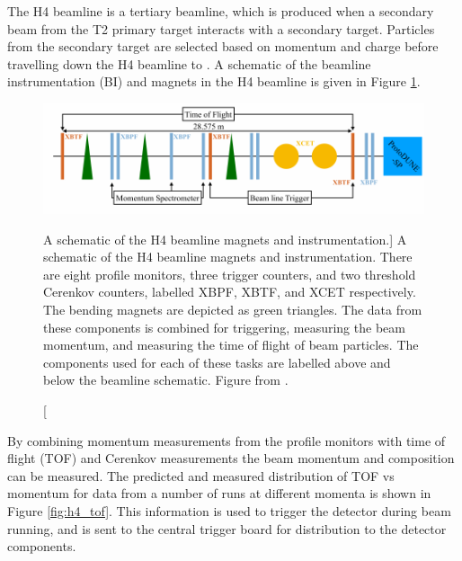 The H4 beamline is a tertiary beamline, which is produced when a secondary beam
from the T2 primary target interacts with a secondary target. Particles from the
secondary target are selected based on momentum and charge before travelling down
the H4 beamline to \protodune{}. A schematic of the beamline instrumentation
(BI) and magnets in the H4 beamline is given in Figure \ref{fig:h4_schem}. 

\begin{figure}

	\centering

	\includegraphics[width=\textwidth]{figures/h4_schem.pdf}

	\caption
	[A schematic of the H4 beamline magnets and instrumentation.]
	{A schematic of the H4 beamline magnets and instrumentation. There are eight
	profile monitors, three trigger counters, and two threshold Cerenkov counters,
	labelled XBPF, XBTF, and XCET respectively. The bending magnets are depicted
	as green triangles. The data from these components is combined for triggering,
	measuring the beam momentum, and measuring the time of flight of beam
	particles. The components used for each of these tasks are labelled above and
	below the beamline schematic. Figure from \cite{protoduneperf}.}

	\label{fig:h4_schem}

\end{figure}

By combining momentum measurements from the profile monitors with time of flight
(TOF) and Cerenkov measurements the beam momentum and composition can be 
measured. The predicted and measured distribution of TOF vs momentum for data 
from a number of runs at different momenta is shown in Figure \ref{fig:h4_tof}.
This information is used to trigger the detector during beam running, and is
sent to the central trigger board for distribution to the detector components.

